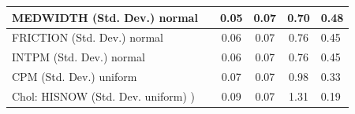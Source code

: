 \begin{table}
\begin{center}
\begin{tabular}{|l|l|c|c|c|l|}
			\hline
			MEDWIDTH (Std. Dev.) normal &  & 0.05 & 0.07 & 0.70 & 0.48 \\
			\hline
			FRICTION (Std. Dev.) normal &  & 0.06 & 0.07 & 0.76 & 0.45 \\
			\hline
			INTPM (Std. Dev.) normal &  & 0.06 & 0.07 & 0.76 & 0.45 \\
			\hline
			CPM (Std. Dev.) uniform &  & 0.07 & 0.07 & 0.98 & 0.33 \\
			\hline
			 Chol: HISNOW (Std. Dev. uniform) ) &  & 0.09 & 0.07 & 1.31 & 0.19 \\
			\hline
		\end{tabular}
	\end{center}
\end{table}
